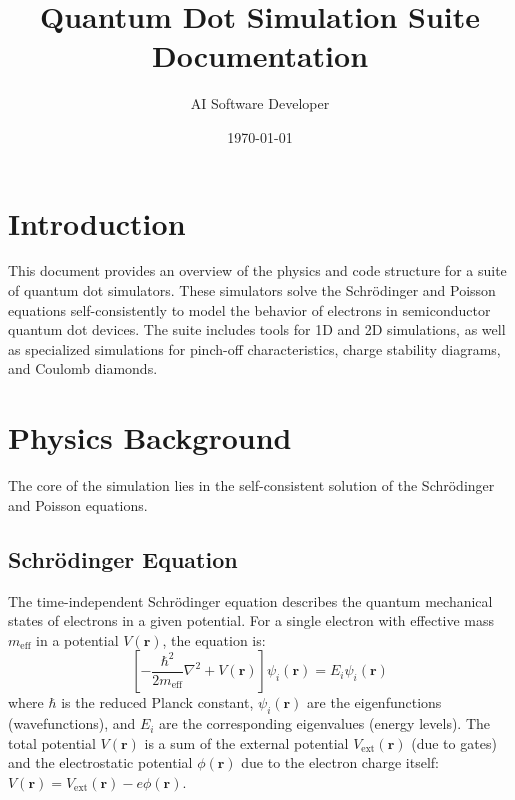 \documentclass{article}
\title{Quantum Dot Simulation Suite Documentation}
\author{AI Software Developer}
\date{\today}
\begin{document}
\maketitle
\tableofcontents
\newpage

\section{Introduction}
This document provides an overview of the physics and code structure for a suite of quantum dot simulators. These simulators solve the Schrödinger and Poisson equations self-consistently to model the behavior of electrons in semiconductor quantum dot devices. The suite includes tools for 1D and 2D simulations, as well as specialized simulations for pinch-off characteristics, charge stability diagrams, and Coulomb diamonds.

\section{Physics Background}
The core of the simulation lies in the self-consistent solution of the Schrödinger and Poisson equations.

\subsection{Schrödinger Equation}
The time-independent Schrödinger equation describes the quantum mechanical states of electrons in a given potential. For a single electron with effective mass $m_{\text{eff}}$ in a potential $V(\mathbf{r})$, the equation is:
\begin{equation}
    \left[ -\frac{\hbar^2}{2m_{\text{eff}}} \nabla^2 + V(\mathbf{r}) \right] \psi_i(\mathbf{r}) = E_i \psi_i(\mathbf{r})
\end{equation}
where $\hbar$ is the reduced Planck constant, $\psi_i(\mathbf{r})$ are the eigenfunctions (wavefunctions), and $E_i$ are the corresponding eigenvalues (energy levels). The total potential $V(\mathbf{r})$ is a sum of the external potential $V_{\text{ext}}(\mathbf{r})$ (due to gates) and the electrostatic potential $\phi(\mathbf{r})$ due to the electron charge itself: $V(\mathbf{r}) = V_{\text{ext}}(\mathbf{r}) - e \phi(\mathbf{r})$.
\end{document}
